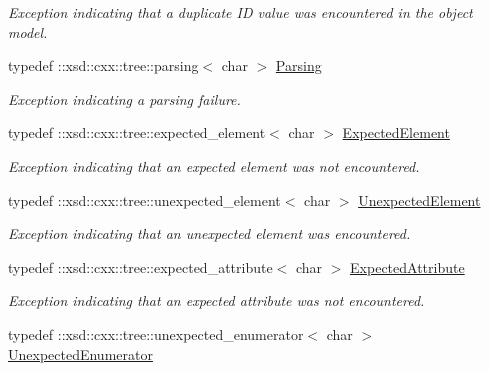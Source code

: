 \begin{DoxyCompactItemize}
\begin{DoxyCompactList}\small\item\em Exception indicating that a duplicate ID value was encountered in the object model. \item\end{DoxyCompactList}\item 
\hypertarget{namespacexml__schema_a439552700a98fdcf8db5e211f47edcb6}{
typedef ::xsd::cxx::tree::parsing$<$ char $>$ \hyperlink{namespacexml__schema_a439552700a98fdcf8db5e211f47edcb6}{Parsing}}
\label{namespacexml__schema_a439552700a98fdcf8db5e211f47edcb6}

\begin{DoxyCompactList}\small\item\em Exception indicating a parsing failure. \item\end{DoxyCompactList}\item 
\hypertarget{namespacexml__schema_affcd8b87d336cb78c21a358711d4e876}{
typedef ::xsd::cxx::tree::expected\_\-element$<$ char $>$ \hyperlink{namespacexml__schema_affcd8b87d336cb78c21a358711d4e876}{ExpectedElement}}
\label{namespacexml__schema_affcd8b87d336cb78c21a358711d4e876}

\begin{DoxyCompactList}\small\item\em Exception indicating that an expected element was not encountered. \item\end{DoxyCompactList}\item 
\hypertarget{namespacexml__schema_a9d851681cf40547856f7e7ef2c2e1f2f}{
typedef ::xsd::cxx::tree::unexpected\_\-element$<$ char $>$ \hyperlink{namespacexml__schema_a9d851681cf40547856f7e7ef2c2e1f2f}{UnexpectedElement}}
\label{namespacexml__schema_a9d851681cf40547856f7e7ef2c2e1f2f}

\begin{DoxyCompactList}\small\item\em Exception indicating that an unexpected element was encountered. \item\end{DoxyCompactList}\item 
\hypertarget{namespacexml__schema_a78581d3d4ffe1356dfe8802b25cda56c}{
typedef ::xsd::cxx::tree::expected\_\-attribute$<$ char $>$ \hyperlink{namespacexml__schema_a78581d3d4ffe1356dfe8802b25cda56c}{ExpectedAttribute}}
\label{namespacexml__schema_a78581d3d4ffe1356dfe8802b25cda56c}

\begin{DoxyCompactList}\small\item\em Exception indicating that an expected attribute was not encountered. \item\end{DoxyCompactList}\item 
\hypertarget{namespacexml__schema_afddcc3f30878e928671a15151128783b}{
typedef ::xsd::cxx::tree::unexpected\_\-enumerator$<$ char $>$ \hyperlink{namespacexml__schema_afddcc3f30878e928671a15151128783b}{UnexpectedEnumerator}}
\label{namespacexml__schema_afddcc3f30878e928671a15151128783b}


\end{DoxyCompactItemize}
